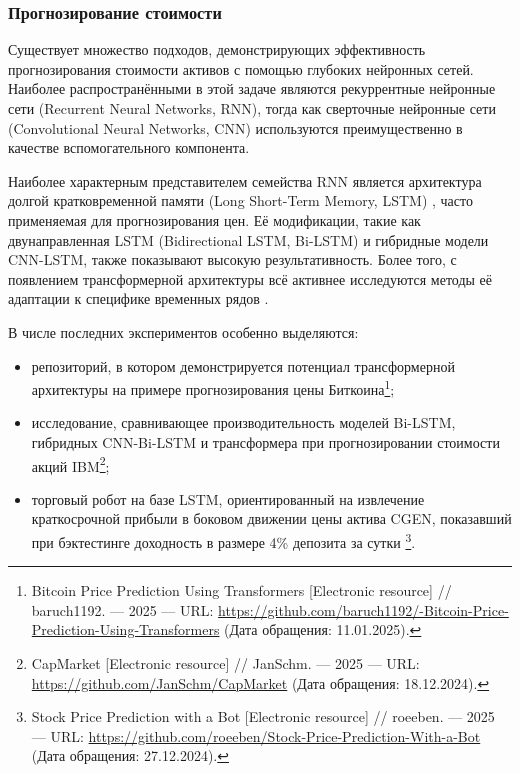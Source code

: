 \subsubsection{Прогнозирование стоимости}
Существует множество подходов, демонстрирующих эффективность прогнозирования стоимости активов с помощью
глубоких нейронных сетей. Наиболее распространёнными в этой задаче являются рекуррентные нейронные сети
(Recurrent Neural Networks, RNN), тогда как сверточные нейронные сети (Convolutional Neural Networks, CNN)
используются преимущественно в качестве вспомогательного компонента.

Наиболее характерным представителем семейства RNN является архитектура долгой кратковременной памяти
(Long Short-Term Memory, LSTM) \parencite{Hochreiter1997LSTM}, часто применяемая для прогнозирования
цен. Её модификации, такие как двунаправленная LSTM (Bidirectional LSTM, Bi-LSTM) и гибридные модели
CNN-LSTM, также показывают высокую результативность. Более того, с появлением трансформерной архитектуры
\parencite{vaswani2017attention} всё активнее исследуются методы её адаптации к специфике временных рядов
\parencite{wen2022transformers}.

В числе последних экспериментов особенно выделяются:

\begin{itemize}
    \item репозиторий, в котором демонстрируется потенциал трансформерной архитектуры на примере прогнозирования
    цены Биткоина\footnote{Bitcoin Price Prediction Using Transformers [Electronic resource] //
    baruch1192. --- 2025 --- URL: \url{https://github.com/baruch1192/-Bitcoin-Price-Prediction-Using-Transformers} (Дата обращения: 11.01.2025).};
    \item исследование, сравнивающее производительность моделей Bi-LSTM, гибридных CNN-Bi-LSTM и трансформера
    при прогнозировании стоимости акций IBM\footnote{CapMarket [Electronic resource] //
    JanSchm. --- 2025 --- URL: \url{https://github.com/JanSchm/CapMarket} (Дата обращения: 18.12.2024).};
    \item торговый робот на базе LSTM, ориентированный на извлечение краткосрочной прибыли в боковом движении
    цены актива CGEN, показавший при бэктестинге доходность в размере 4\% депозита за сутки
    \footnote{Stock Price Prediction with a Bot [Electronic resource] //
    roeeben. --- 2025 --- URL: \url{https://github.com/roeeben/Stock-Price-Prediction-With-a-Bot} (Дата обращения: 27.12.2024).}.
\end{itemize}



